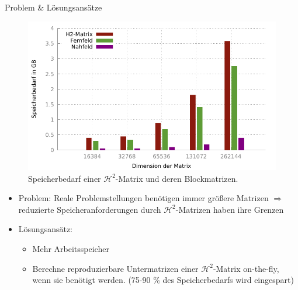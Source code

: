 \documentclass[10pt]{beamer}
\begin{document}
\begin{frame}{Problem \& Lösungsansätze}
  \begin{figure}
    \centering
    \includegraphics[width=.45\linewidth]{figures/fg-memory-h2-nf-ff.pdf}
    \caption{Speicherbedarf einer \(\mathcal{H}^2\)-Matrix und deren Blockmatrizen.}
  \end{figure}
  \begin{itemize}
    \item Problem: Reale Problemstellungen benötigen immer größere Matrizen
          \(\Rightarrow\) reduzierte Speicheranforderungen durch
          \(\mathcal{H}^2\)-Matrizen haben ihre Grenzen
    \item Lösungsansätz:
    \begin{itemize}
      \item Mehr Arbeitsspeicher
      \item Berechne reproduzierbare Untermatrizen einer
            \(\mathcal{H}^2\)-Matrix on-the-fly, wenn sie benötigt werden.
            (75-90 \% des Speicherbedarfs wird eingespart)
    \end{itemize}
  \end{itemize}
\end{frame}
\end{document}
